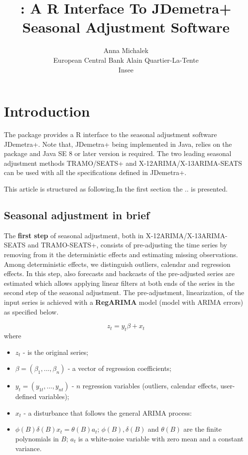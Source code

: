 \documentclass[article]{jss}
\author{
Anna Michalek\\European Central Bank \And Alain Quartier-La-Tente\\Insee
}
\title{\pkg{RJDemetra}: A R Interface To JDemetra+ Seasonal Adjustment Software}
\providecommand{\tightlist}{%
  \setlength{\itemsep}{0pt}\setlength{\parskip}{0pt}}
\begin{document}
\hypertarget{introduction}{%
\section{Introduction}\label{introduction}}

The package  provides a R interface to the seasonal
adjustment software JDemetra+. Note that, JDemetra+ being implemented in
Java,  relies on the  package and Java SE 8 or
later version is required. The two leading seasonal adjustment methods
TRAMO/SEATS+ and X-12ARIMA/X-13ARIMA-SEATS can be used with all the
specifications defined in JDemetra+.

This article is structured as following.In the first section the .. is
presented.

\hypertarget{seasonal-adjustment-in-brief}{%
\subsection{Seasonal adjustment in
brief}\label{seasonal-adjustment-in-brief}}

The \textbf{first step} of seasonal adjustment, both in
X-12ARIMA/X-13ARIMA-SEATS and TRAMO-SEATS+, consists of pre-adjusting
the time series by removing from it the deterministic effects and
estimating missing observations. Among deterministic effects, we
distinguish outliers, calendar and regression effects. In this step,
also forecasts and backcasts of the pre-adjusted series are estimated
which allows applying linear filters at both ends of the series in the
second step of the seasonal adjustment. The pre-adjustment,
linearization, of the input series is achieved with a \textbf{RegARIMA}
model (model with ARIMA errors) as specified below.

\[z_t=y_t\beta+x_t\] where

\begin{itemize}
\tightlist
\item
  \(z_t\) - is the original series;
\item
  \(\beta = (\beta_1,...,\beta_n)\) - a vector of regression
  coefficients;
\item
  \(y_t = (y_{1t},...,y_{nt})\) - \(n\) regression variables (outliers,
  calendar effects, user-defined variables);
\item
  \(x_t\) - a disturbance that follows the general ARIMA process:
\item
  \(\phi(B)\delta(B)x_t=\theta(B)a_t\); \(\phi(B), \delta(B)\) and
  \(\theta(B)\) are the finite polynomials in \(B\); \(a_t\) is a
  white-noise variable with zero mean and a constant variance.
\end{itemize}
\end{document}
